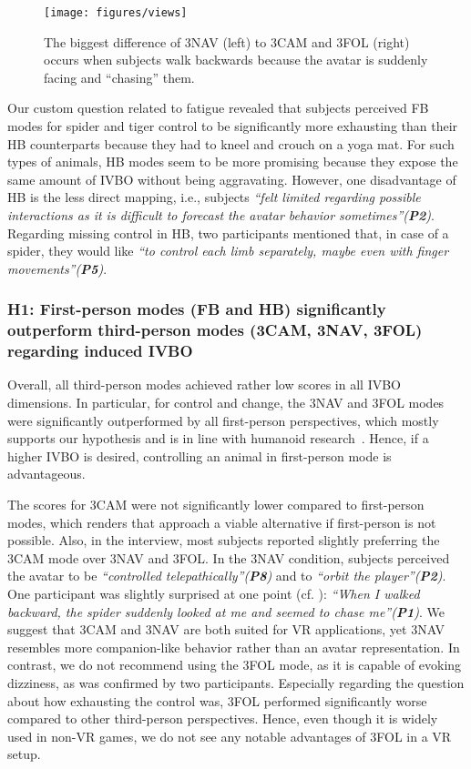 \begin{figure}[b]
\centering
\texttt{[image: figures/views]}
\caption{The biggest difference of 3NAV (left) to 3CAM and 3FOL (right) occurs when subjects walk backwards because the avatar is suddenly facing and ``chasing'' them.
}
\label{fig:chase}
\end{figure}
Our custom question related to fatigue revealed that subjects perceived FB modes for spider and tiger control to be significantly more exhausting than their HB counterparts because they had to kneel and crouch on a yoga mat. For such types of animals, HB modes seem to be more promising because they expose the same amount of IVBO without being aggravating. However, one disadvantage of HB is the less direct mapping, i.e., subjects \textit{``felt limited regarding possible interactions as it is difficult to forecast the avatar behavior sometimes''(\textbf{P2})}. Regarding missing control in HB, two participants mentioned that, in case of a spider, they would like \textit{``to control each limb separately, maybe even with finger movements''(\textbf{P5})}.


\subsubsection{\textbf{H1:} First-person modes (FB and HB) significantly outperform third-person modes (3CAM, 3NAV, 3FOL) regarding induced IVBO} Overall, all third-person modes achieved rather low scores in all IVBO dimensions. In particular, for control and change, the 3NAV and 3FOL modes were significantly outperformed by all first-person perspectives, which mostly supports our hypothesis and is in line with humanoid research~\cite{galvan2015characterizing, maselli2013building}. Hence, if a higher IVBO is desired, controlling an animal in first-person mode is advantageous.

The scores for 3CAM were not significantly lower compared to first-person modes, which renders that approach a viable alternative if first-person is not possible. Also, in the interview, most subjects reported slightly preferring the 3CAM mode over 3NAV and 3FOL. In the 3NAV condition, subjects perceived the avatar to be \textit{``controlled telepathically''(\textbf{P8})} and to \textit{``orbit the player''(\textbf{P2})}. One participant was slightly surprised at one point (cf. ): \textit{``When I walked backward, the spider suddenly looked at me and seemed to chase me''(\textbf{P1})}. We suggest that 3CAM and 3NAV are both suited for VR applications, yet 3NAV resembles more companion-like behavior rather than an avatar representation. In contrast, we do not recommend using the 3FOL mode, as it is capable of evoking dizziness, as was confirmed by two participants. Especially regarding the question about how exhausting the control was, 3FOL performed significantly worse compared to other third-person perspectives. Hence, even though it is widely used in non-VR games, we do not see any notable advantages of 3FOL in a VR setup.



